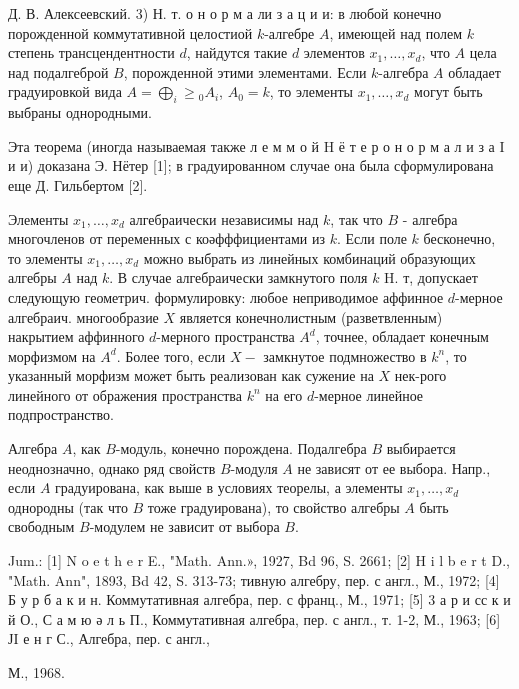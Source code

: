 \documentclass[10pt]{article}
\begin{document}
Д. В. Алексеевский. 3) Н. т. о н о р м а ли з а ц и и: в любой конечно порожденной коммутативной целостиой $k$-алгебре $A$, имеющей над полем $k$ степень трансцендентности $d$, найдутся такие $d$ элементов $x_{1}, \ldots, x_{d}$, что $A$ цела над подалгеброй $B$, порожденной этими элементами. Если $k$-алгебра $A$ обладает градуировкой вида $A=\bigoplus_{i} \geqslant{ }_{0} A_{i}$, $A_{0}=k$, то элементы $x_{1}, \ldots, x_{d}$ могут быть выбраны однородными.



Эта теорема (иногда называемая также л е м м о й H ё т е р о н о р м а л и з а I и и) доказана Э. Нётер [1]; в градуированном случае она была сформулирована еще Д. Гильбертом [2].



Элементы $x_{1}, \ldots, x_{d}$ алгебраически независимы над $k$, так что $B$ - алгебра многочленов от переменных с коәфффициентами из $k$. Если поле $k$ бесконечно, то элементы $x_{1}, \ldots, x_{d}$ можно выбрать из линейных комбинаций образующих алгебры $A$ над $k$. В случае алгебраически замкнутого поля $k$ H. т, допускает следующую геометрич. формулировку: любое неприводимое аффинное $d$-мерное алгебраич. многообразие $X$ является конечнолистным (разветвленным) накрытием аффинного $d$-мерного пространства $A^{d}$, точнее, обладает конечным морфизмом на $A^{d}$. Более того, если $X-$ замкнутое подмножество в $k^{n}$, то указанный морфизм может быть реализован как сужение на $X$ нек-рого линейного от ображения пространства $k^{n}$ на его $d$-мерное линейное подпространство.



Алгебра $A$, как $B$-модуль, конечно порождена. Подалгебра $B$ выбирается неоднозначно, однако ряд свойств $B$-модуля $A$ не зависят от ее выбора. Напр., если $A$ градуирована, как выше в условиях теорелы, а элементы $x_{1}, \ldots, x_{d}$ однородны (так что $B$ тоже градуирована), то свойство алгебры $A$ быть свободным $B$-модулем не зависит от выбора $B$.



Jum.: [1] N o e t h e r E., "Math. Ann.», 1927, Bd 96, S. 2661; [2] H i l b e r t D., "Math. Ann", 1893, Bd 42, S. 313-73; тивную алгебру, пер. с англ., М., 1972; [4] Б у р б а к и н. Коммутативная алгебра, пер. с франц., М., 1971; [5] 3 а р и сс к и й О., С а м ю ә л ь П., Коммутативная алгебра, пер. с англ., т. 1-2, М., 1963; [6] ЈI е н г С., Алгебра, пер. с англ.,

М., 1968.
\end{document}
